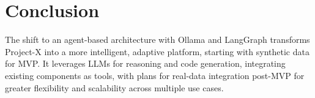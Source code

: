 \documentclass{article}
\begin{document}
\section{Conclusion}
The shift to an agent-based architecture with Ollama and LangGraph transforms Project-X into a more intelligent, adaptive platform, starting with synthetic data for MVP. It leverages LLMs for reasoning and code generation, integrating existing components as tools, with plans for real-data integration post-MVP for greater flexibility and scalability across multiple use cases.
\end{document}
